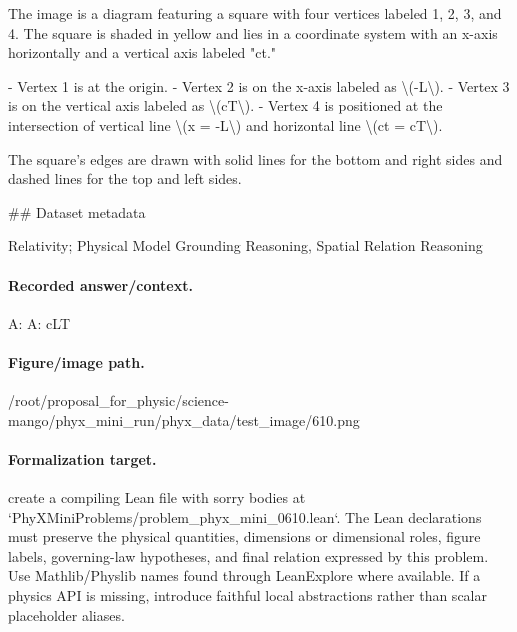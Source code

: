 The image is a diagram featuring a square with four vertices labeled 1, 2, 3, and 4. The square is shaded in yellow and lies in a coordinate system with an x-axis horizontally and a vertical axis labeled "ct." 

- Vertex 1 is at the origin.
- Vertex 2 is on the x-axis labeled as \textbackslash{}(-L\textbackslash{}).
- Vertex 3 is on the vertical axis labeled as \textbackslash{}(cT\textbackslash{}).
- Vertex 4 is positioned at the intersection of vertical line \textbackslash{}(x = -L\textbackslash{}) and horizontal line \textbackslash{}(ct = cT\textbackslash{}).

The square's edges are drawn with solid lines for the bottom and right sides and dashed lines for the top and left sides.

\#\# Dataset metadata

Relativity; Physical Model Grounding Reasoning, Spatial Relation Reasoning

\paragraph{Recorded answer/context.}
A: A: cLT

\paragraph{Figure/image path.}
/root/proposal\_for\_physic/science-mango/phyx\_mini\_run/phyx\_data/test\_image/610.png

\paragraph{Formalization target.}
create a compiling Lean file with sorry bodies at `PhyXMiniProblems/problem\_phyx\_mini\_0610.lean`. The Lean declarations must preserve the physical quantities, dimensions or dimensional roles, figure labels, governing-law hypotheses, and final relation expressed by this problem.
Use Mathlib/Physlib names found through LeanExplore where available. If a physics API is missing, introduce faithful local abstractions rather than scalar placeholder aliases.

